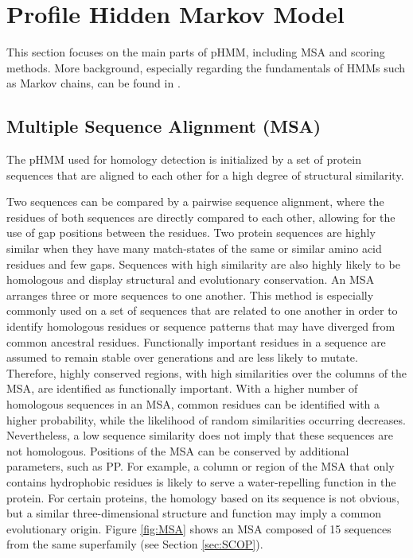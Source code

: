 
\section{Profile Hidden Markov Model}

This section focuses on the main parts of \ac{pHMM}, including \ac{MSA} and scoring methods. More background, especially regarding the fundamentals of \acp{HMM} such as Markov chains, can be found in \cite{Durbin.1998, Baldi.2001}.  

\subsection{Multiple Sequence Alignment (MSA)}
\label{sec:MSA}

The \ac{pHMM} used for homology detection is initialized by a set of protein sequences that are aligned to each other for a high degree of structural similarity.

Two sequences can be compared by a pairwise sequence alignment, where the residues of both sequences are directly compared to each other, allowing for the use of gap positions between the residues. Two protein sequences are highly similar when they have many match-states of the same or similar amino acid residues and few gaps. Sequences with high similarity are also highly likely to be homologous and display structural and evolutionary conservation. 
An \ac{MSA} arranges three or more sequences to one another. This method is especially commonly used on a set of sequences that are related to one another in order to identify homologous residues or sequence patterns that may have diverged from common ancestral residues.  
Functionally important residues in a sequence are assumed to remain stable over generations and are less likely to mutate. Therefore, highly conserved regions, with high similarities over the columns of the \ac{MSA}, are identified as functionally important. With a higher number of homologous sequences in an \ac{MSA}, common residues can be identified with a higher probability, while  the likelihood of random similarities occurring decreases.
Nevertheless, a low sequence similarity does not imply that these sequences are not homologous. Positions of the \ac{MSA} can be conserved by additional parameters, such as \ac{PP}. For example, a column or region of the \ac{MSA} that only contains hydrophobic residues is likely to serve a water-repelling function in the protein. 
For certain proteins, the homology based on its sequence is not obvious, but a similar three-dimensional structure and function may imply a common evolutionary origin. 
  Figure \ref{fig:MSA} shows an \ac{MSA} composed of 15 sequences from the same superfamily (see Section \ref{sec:SCOP}).

